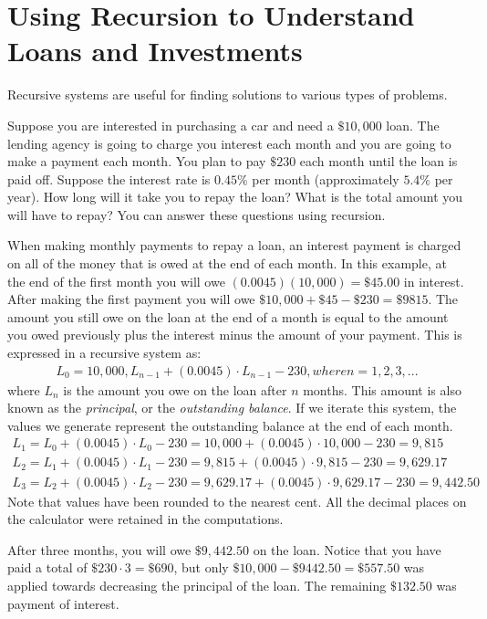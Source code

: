 \documentclass[10pt,]{book}
\theoremstyle{plain}
\theoremstyle{definition}
\theoremstyle{definition}
\theoremstyle{definition}
\numberwithin{equation}{section}
\begin{document}
\section[{Using Recursion to Understand Loans and Investments}]{Using Recursion to Understand Loans and Investments}\label{chapter04-section02}
Recursive systems are useful for finding solutions to various types of problems.%
\par
Suppose you are interested in purchasing a car and need a \(\$10,000\) loan. The lending agency is going to charge you interest each month and you are going to make a payment each month. You plan to pay \(\$230\) each month until the loan is paid off. Suppose the interest rate is \(0.45\%\) per month (approximately \(5.4\%\) per year). How long will it take you to repay the loan? What is the total amount you will have to repay?  You can answer these questions using recursion.%
\par
When making monthly payments to repay a loan, an interest payment is charged on all of the money that is owed at the end of each month.  In this example, at the end of the first month you will owe \((0.0045)(10,000)=\$45.00\) in interest. After making the first payment you will owe \(\$10,000+\$45-\$230=\$9815\). The amount you still owe on the loan at the end of a month is equal to the amount you owed previously plus the interest minus the amount of your payment. This is expressed in a recursive system as:%
%
\begin{gather*}
L_0=10,000, L_{n-1}+(0.0045)\cdot L_{n-1}-230, where n=1,2,3,...
\end{gather*}
where \(L_n\) is the amount you owe on the loan after \(n\) months.  This amount is also known as the \emph{principal}, or the \emph{outstanding balance}. If we iterate this system, the values we generate represent the outstanding balance at the end of each month.%
%
\begin{gather*}
L_1=L_0+(0.0045)\cdot L_0-230=10,000+(0.0045)\cdot 10,000-230=9,815\\
L_2=L_1+(0.0045)\cdot L_1-230=9,815+(0.0045)\cdot 9,815-230=9,629.17\\
L_3=L_2+(0.0045)\cdot L_2-230=9,629.17+(0.0045)\cdot 9,629.17-230=9,442.50
\end{gather*}
Note that values have been rounded to the nearest cent.  All the decimal places on the calculator were retained in the computations.%
\par
After three months, you will owe \(\$9,442.50\) on the loan. Notice that you have paid a total of \(\$230\cdot 3=\$690\), but only \(\$10,000-\$9442.50=\$557.50\) was applied towards decreasing the principal of the loan. The remaining \(\$132.50\) was payment of interest.%
\end{document}
